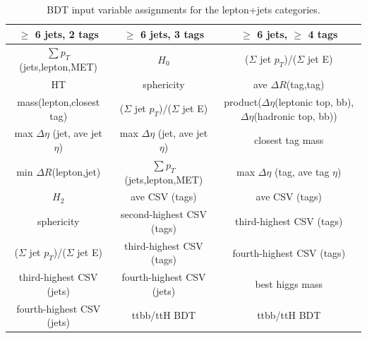 \begin{table}
\begin{tabular}{ c | c | c |}
\hline
  \multicolumn{1}{|c|}{$\geq$ 6 jets, 2 tags}  				& $\geq$ 6 jets, 3 tags  			&  $\geq$ 6 jets, $\geq$ 4 tags \\
\hline
  \multicolumn{1}{|c|}{\(\sum p_{T}\)(jets,lepton,MET)}  		&  $H_{0}$  					&  (\(\Sigma\) jet \(p_{T}\))/(\(\Sigma\) jet E) \\
  \multicolumn{1}{|c|}{HT}  						&  sphericity					&  ave \(\Delta R\)(tag,tag) \\
  \multicolumn{1}{|c|}{mass(lepton,closest tag)} 			&  (\(\Sigma\) jet \(p_{T}\))/(\(\Sigma\) jet E)&  product(\(\Delta \eta\)(leptonic top, bb), \(\Delta \eta\)(hadronic top, bb)) \\
  \multicolumn{1}{|c|}{max \(\Delta \eta\) (jet, ave jet \(\eta\))}  	&  max \(\Delta \eta\) (jet, ave jet \(\eta\)) 	&  closest tag mass \\
  \multicolumn{1}{|c|}{min \(\Delta R\)(lepton,jet)} 			&  \(\sum p_{T}\)(jets,lepton,MET)  		&  max \(\Delta \eta\) (tag, ave tag \(\eta\)) \\
  \multicolumn{1}{|c|}{\(H_{2}\)} 					&  ave CSV (tags)  				&  ave CSV (tags) \\
  \multicolumn{1}{|c|}{sphericity} 					&  second-highest CSV (tags)			&  third-highest CSV (tags) \\
  \multicolumn{1}{|c|}{(\(\Sigma\) jet \(p_{T}\))/(\(\Sigma\) jet E)} 	&  third-highest CSV (tags) 			&  fourth-highest CSV (tags) \\
  \multicolumn{1}{|c|}{third-highest CSV (jets)} 			&  fourth-highest CSV (jets)  			&  best higgs mass \\
  \multicolumn{1}{|c|}{fourth-highest CSV (jets)} 			&  ttbb/ttH BDT  				&  ttbb/ttH BDT \\

\hline
\end{tabular}
\caption{BDT input variable assignments for the lepton+jets categories.}
\label{tab:vars_by_category}
\end{table}



